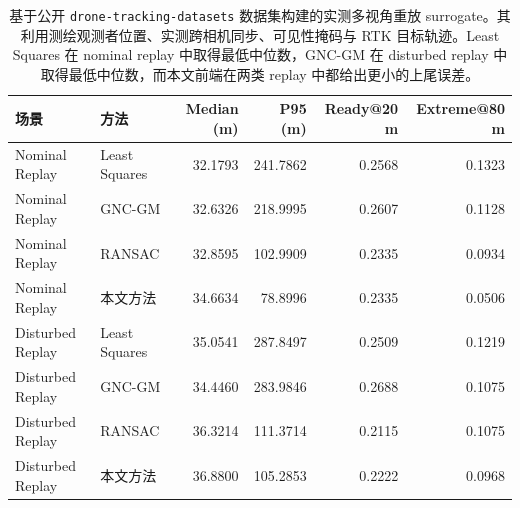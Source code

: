 \begin{table}[!htbp]
\centering
\caption{基于公开 \texttt{drone-tracking-datasets} 数据集构建的实测多视角重放 surrogate。其利用测绘观测者位置、实测跨相机同步、可见性掩码与 RTK 目标轨迹。Least Squares 在 nominal replay 中取得最低中位数，GNC-GM 在 disturbed replay 中取得最低中位数，而本文前端在两类 replay 中都给出更小的上尾误差。}
\label{tab:publicrealreplay}
\small
\begin{tabular}{llrrrr}
\toprule
场景 & 方法 & Median (m) & P95 (m) & Ready@20 m & Extreme@80 m \\
\midrule
Nominal Replay   & Least Squares & 32.1793 & 241.7862 & 0.2568 & 0.1323 \\
Nominal Replay   & GNC-GM        & 32.6326 & 218.9995 & 0.2607 & 0.1128 \\
Nominal Replay   & RANSAC        & 32.8595 & 102.9909 & 0.2335 & 0.0934 \\
Nominal Replay   & 本文方法       & 34.6634 &  78.8996 & 0.2335 & 0.0506 \\
\midrule
Disturbed Replay & Least Squares & 35.0541 & 287.8497 & 0.2509 & 0.1219 \\
Disturbed Replay & GNC-GM        & 34.4460 & 283.9846 & 0.2688 & 0.1075 \\
Disturbed Replay & RANSAC        & 36.3214 & 111.3714 & 0.2115 & 0.1075 \\
Disturbed Replay & 本文方法       & 36.8800 & 105.2853 & 0.2222 & 0.0968 \\
\bottomrule
\end{tabular}
\end{table}
